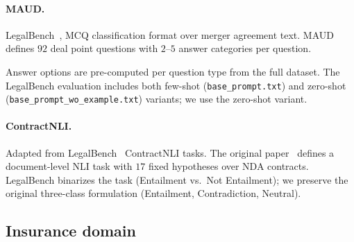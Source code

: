 \paragraph{MAUD.}
LegalBench~\cite{guha2023legalbench}, MCQ classification format over
merger agreement text. MAUD~\cite{wang2023maud} defines $92$ deal
point questions with $2$--$5$ answer categories per question.


Answer options are pre-computed per question type from the full
dataset. The LegalBench evaluation includes both few-shot
(\texttt{base\_prompt.txt}) and zero-shot
(\texttt{base\_prompt\_wo\_example.txt}) variants; we use the
zero-shot variant.

\paragraph{ContractNLI.}
Adapted from LegalBench~\cite{guha2023legalbench} ContractNLI tasks.
The original paper~\cite{koreeda2021contractnli} defines a
document-level NLI task with $17$ fixed hypotheses over NDA
contracts. LegalBench binarizes the task (Entailment vs.\ Not
Entailment); we preserve the original three-class formulation
(Entailment, Contradiction, Neutral).


\subsection{Insurance domain}

